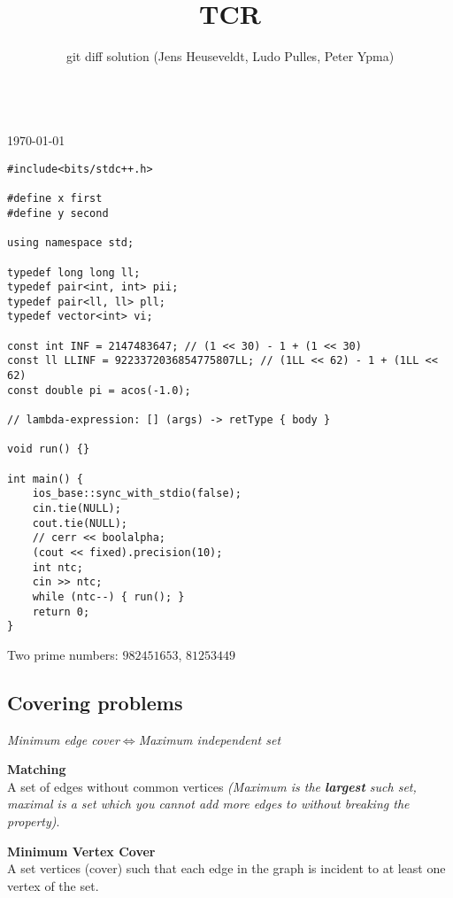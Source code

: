 \documentclass{article}
\title{TCR}
\author{git diff solution (Jens Heuseveldt, Ludo Pulles, Peter Ypma)}
\begin{document}
\begin{center}
	\makeatletter
	\textbf{\@title} \\
	\today \\
	\emph{\@author}
	\makeatother
\end{center}


\begin{lstlisting}
#include<bits/stdc++.h>

#define x first
#define y second

using namespace std;

typedef long long ll;
typedef pair<int, int> pii;
typedef pair<ll, ll> pll;
typedef vector<int> vi;

const int INF = 2147483647; // (1 << 30) - 1 + (1 << 30)
const ll LLINF = 9223372036854775807LL; // (1LL << 62) - 1 + (1LL << 62)
const double pi = acos(-1.0);

// lambda-expression: [] (args) -> retType { body }

void run() {}

int main() {
	ios_base::sync_with_stdio(false);
	cin.tie(NULL);
	cout.tie(NULL);
	// cerr << boolalpha;
	(cout << fixed).precision(10);
	int ntc;
	cin >> ntc;
	while (ntc--) { run(); }
	return 0;
}

\end{lstlisting}

Two prime numbers: $\mathit{982451653}$, $\mathit{81253449}$

\subsection{Covering problems}

\begin{center}
	\emph{Minimum edge cover$\iff$Maximum independent set}
\end{center}

\textbf{Matching} \\
A set of edges without common vertices \textit{(Maximum is the \textbf{largest} such set, maximal is a set which you cannot add more edges to without breaking the property)}.

\textbf{Minimum Vertex Cover} \\
A set vertices (cover) such that each edge in the graph is incident to at least one vertex of the set.
\end{document}
